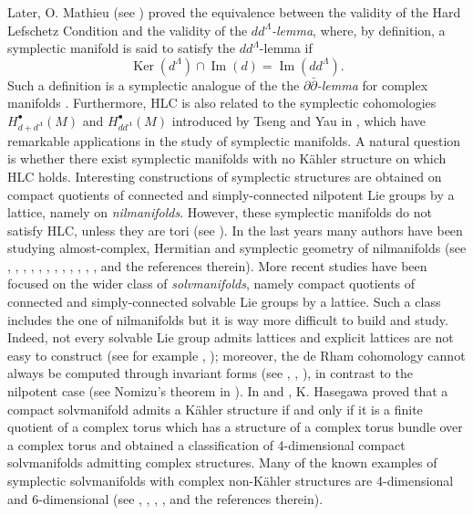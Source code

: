 \documentclass[a4paper, 11pt]{amsart}
\theoremstyle{plain}
\theoremstyle{definition}
\newcommand{\del}{\partial}
\newcommand{\delbar}{\bar{\partial}}
\DeclareMathOperator{\Ker}{Ker}
\DeclareMathOperator{\im}{Im}
\numberwithin{equation}{section}
\begin{document}
Later, O. Mathieu (see \cite{Mathieu}) proved the equivalence between the validity of the Hard Lefschetz Condition and the validity of the \textit{$dd^{\Lambda}$-lemma}, where, by definition, a symplectic manifold is said to satisfy the {$dd^{\Lambda}$-lemma if $$\Ker(d^{\Lambda}) \cap \im(d) = \im(dd^{\Lambda}).$$
Such a definition is a symplectic analogue of the  the\textit{ $\del\delbar$-lemma} for complex manifolds \cite{DGMS}. 
Furthermore, HLC is also related to the symplectic cohomologies $H^{\bullet}_{d+d^\Lambda}(M)$ and $H^{\bullet}_{dd^\Lambda}(M)$ introduced by Tseng and Yau in \cite{TY}, which have remarkable applications in the study of symplectic manifolds.
\newline
A natural question is whether there exist symplectic manifolds with no K\"ahler structure on which HLC holds. Interesting constructions of symplectic structures are obtained on compact quotients of connected and simply-connected nilpotent Lie groups by a lattice, namely on \textit{nilmanifolds}. However, these symplectic manifolds do not satisfy HLC, unless they are tori (see \cite{BG}). In the last years many authors have been studying almost-complex, Hermitian and symplectic geometry of nilmanifolds (see \cite{Ugarte}, \cite{Yan}, \cite{AK1}, \cite{DBT}, \cite{cavalcanti}, \cite{AGS}, \cite{Salamon}, \cite{CFM}, \cite{CFGU}, \cite{UV}, \cite{FGV}, \cite{FV}, \cite{FP} and the references therein). More recent studies have been focused on the wider class of \textit{solvmanifolds}, namely compact quotients of connected and simply-connected solvable Lie groups by a lattice. Such a class includes the one of nilmanifolds but it is way more difficult to build and study. Indeed, not every solvable Lie group admits lattices and explicit lattices are not easy to construct (see for example \cite{Auslander}, \cite{Yamada}); moreover, the de Rham cohomology cannot always be computed through invariant forms (see \cite{Hattori}, \cite{CF}, \cite{Kasuya1}), in contrast to the nilpotent case (see Nomizu's theorem in \cite{Nomizu}). In \cite{Hasegawa} and \cite{Hasegawa1}, K. Hasegawa proved that a compact solvmanifold admits a K\"ahler structure if and only if it is a finite quotient of a complex torus which has a structure of a complex torus bundle over a complex torus and obtained a classification of 4-dimensional compact solvmanifolds admitting complex structures.
Many of the known examples of symplectic solvmanifolds with complex non-K\"ahler structures are 4-dimensional and 6-dimensional (see \cite{TT}, \cite{FGG}, \cite{BG1}, \cite{Ovando}, \cite{DBT1} and the references therein).\\[5pt]
}
\end{document}
